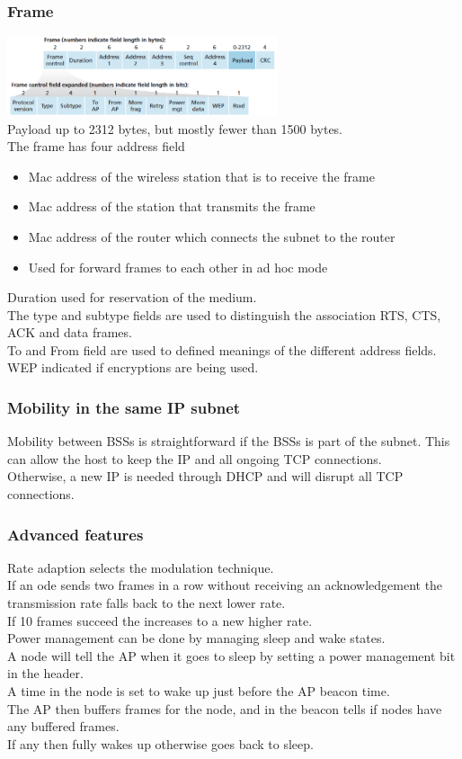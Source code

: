 \documentclass[12pt, a4paper]{article}
\begin{document}
		\subsubsection{Frame}
			\includegraphics[width=300px]{assets/wifiFrame.png}\\
			Payload up to 2312 bytes, but mostly fewer than 1500 bytes.\\
			The frame has four address field
			\begin{itemize}
				\item Mac address of the wireless station that is to receive the frame
				\item Mac address of the station that transmits the frame
				\item Mac address of the router which connects the subnet to the router
				\item Used for forward frames to each other in ad hoc mode
			\end{itemize}
			Duration used for reservation of the medium.\\
			The type and subtype fields are used to distinguish the association RTS, CTS, ACK and data frames.\\
			To and From field are used to defined meanings of the different address fields.\\
			WEP indicated if encryptions are being used.
		\subsubsection{Mobility in the same IP subnet}
			Mobility between BSSs is straightforward if the BSSs is part of the subnet.
			This can allow the host to keep the IP and all ongoing TCP connections.\\
			Otherwise, a new IP is needed through DHCP and will disrupt all TCP connections.\\
		\subsubsection{Advanced features}
			Rate adaption selects the modulation technique.\\
			If an ode sends two frames in a row without receiving an acknowledgement the transmission rate falls back to the next lower rate.\\
			If 10 frames succeed the increases to a new higher rate.\\
			Power management can be done by managing sleep and wake states.\\
			A node will tell the AP when it goes to sleep by setting a power management bit in the header.\\
			A time in the node is set to wake up just before the AP beacon time.\\
			The AP then buffers frames for the node, and in the beacon tells if nodes have any buffered frames.\\
			If any then fully wakes up otherwise goes back to sleep.\\
\end{document}
